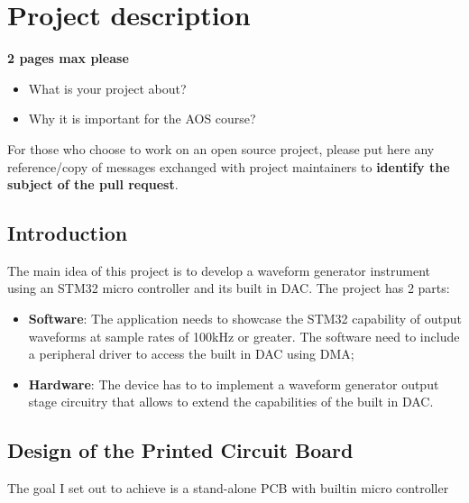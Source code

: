 \section{Project description}

\textbf{2 pages max please}

\begin{itemize}
    \item What is your project about?
    \item Why it is important for the AOS course?
\end{itemize}

For those who choose to work on an open source project, please put here any
reference/copy of messages exchanged with project maintainers to \textbf{identify the subject
    of the pull request}.

\subsection{Introduction}

The main idea of this project is to develop a waveform generator instrument using an STM32
micro controller and its built in DAC. The project has 2 parts:
\begin{itemize}
    \item \textbf{Software}: The application needs to showcase the STM32 capability of output
          waveforms  at sample rates of 100kHz or greater. The software need to include a
          peripheral driver to access the built in DAC using DMA;
    \item \textbf{Hardware}: The device has to to implement a waveform generator output stage
          circuitry that allows to extend the capabilities of the built in DAC.
\end{itemize}


\subsection{Design of the Printed Circuit Board}

The goal I set out to achieve is a stand-alone PCB with builtin micro controller
